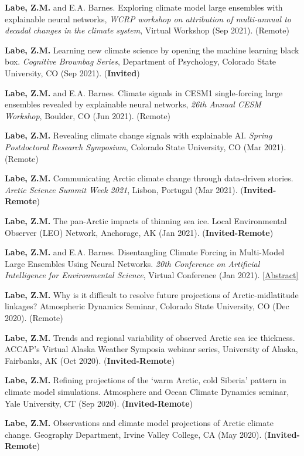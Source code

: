 \documentclass[margin,line,palatino,courier,10pt]{res}
\begin{document}
\begin{resume}
\begin{etaremune}[leftmargin=0in,topsep=0in,parsep=0in]
\item \textbf{Labe, Z.M.} and E.A. Barnes. Exploring climate model large ensembles with explainable neural networks, \textit{WCRP workshop on attribution of multi-annual to decadal changes in the climate system}, Virtual Workshop (Sep 2021). (Remote)
\item \textbf{Labe, Z.M.} Learning new climate science by opening the machine learning black box. \textit{Cognitive Brownbag Series}, Department of Psychology, Colorado State University, CO (Sep 2021). (\textbf{Invited})
\item \textbf{Labe, Z.M.} and E.A. Barnes. Climate signals in CESM1 single-forcing large ensembles revealed by explainable neural networks, \textit{26th Annual CESM Workshop}, Boulder, CO (Jun 2021). (Remote)
\item \textbf{Labe, Z.M.} Revealing climate change signals with explainable AI. \textit{Spring Postdoctoral Research Symposium}, Colorado State University, CO (Mar 2021). (Remote)
\item \textbf{Labe, Z.M.} Communicating Arctic climate change through data-driven stories. \textit{Arctic Science Summit Week 2021}, Lisbon, Portugal (Mar 2021). (\textbf{Invited-Remote})
\item \textbf{Labe, Z.M.} The pan-Arctic impacts of thinning sea ice. Local Environmental Observer (LEO) Network, Anchorage, AK (Jan 2021). (\textbf{Invited-Remote})
\item \textbf{Labe, Z.M.} and E.A. Barnes. Disentangling Climate Forcing in Multi-Model Large Ensembles Using Neural Networks. \textit{20th Conference on Artificial Intelligence for Environmental Science}, Virtual Conference (Jan 2021). \href{https://ams.confex.com/ams/101ANNUAL/meetingapp.cgi/Paper/379553}{[Abstract]}
\item \textbf{Labe, Z.M.} Why is it difficult to resolve future projections of Arctic-midlatitude linkages? Atmospheric Dynamics Seminar, Colorado State University, CO (Dec 2020). (Remote)
\item \textbf{Labe, Z.M.} Trends and regional variability of observed Arctic sea ice thickness. ACCAP’s Virtual Alaska Weather Symposia webinar series, University of Alaska, Fairbanks, AK (Oct 2020). (\textbf{Invited-Remote})
\item \textbf{Labe, Z.M.} Refining projections of the `warm Arctic, cold Siberia' pattern in climate model simulations. Atmosphere and Ocean Climate Dynamics seminar, Yale University, CT (Sep 2020). (\textbf{Invited-Remote})
\item \textbf{Labe, Z.M.} Observations and climate model projections of Arctic climate change. Geography Department, Irvine Valley College, CA (May 2020). (\textbf{Invited-Remote})

\end{etaremune}
\end{resume}
\end{document}
